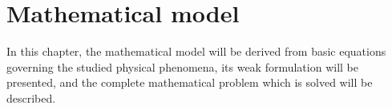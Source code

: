 \chapter{Mathematical model}
In this chapter, the mathematical model will be derived from basic equations governing the studied physical phenomena, its weak formulation will be presented, and the complete mathematical problem which is solved will be described.




